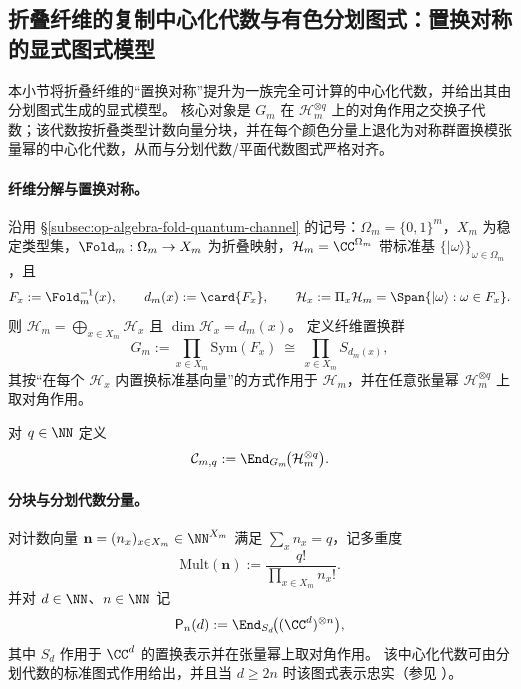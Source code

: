 \subsection{折叠纤维的复制中心化代数与有色分划图式：置换对称的显式图式模型}\label{subsec:op-algebra-fold-replication-centralizer}
本小节将折叠纤维的“置换对称”提升为一族完全可计算的中心化代数，并给出其由分划图式生成的显式模型。
核心对象是 \(G_m\) 在 \(\mathcal{H}_m^{\otimes q}\) 上的对角作用之交换子代数；该代数按折叠类型计数向量分块，并在每个颜色分量上退化为对称群置换模张量幂的中心化代数，从而与分划代数/平面代数图式严格对齐。

\providecommand{\ket}[1]{\lvert #1\rangle}
\providecommand{\bra}[1]{\langle #1\rvert}
\providecommand{\Mult}{\mathrm{Mult}}

\paragraph{纤维分解与置换对称。}
沿用 \S\ref{subsec:op-algebra-fold-quantum-channel} 的记号：\(\Omega_m=\{0,1\}^m\)，\(X_m\) 为稳定类型集，\(\Fold_m:\Omega_m\to X_m\) 为折叠映射，\(\mathcal{H}_m=\CC^{\Omega_m}\) 带标准基 \(\{\ket{\omega}\}_{\omega\in\Omega_m}\)，且
\[
F_x:=\Fold_m^{-1}(x),\qquad d_m(x):=\card{F_x},\qquad \mathcal{H}_x:=\Pi_x\mathcal{H}_m=\Span\{\ket{\omega}:\omega\in F_x\}.
\]
则 \(\mathcal{H}_m=\bigoplus_{x\in X_m}\mathcal{H}_x\) 且 \(\dim\mathcal{H}_x=d_m(x)\)。
定义纤维置换群
\[
G_m:=\prod_{x\in X_m}\mathrm{Sym}(F_x)\ \cong\ \prod_{x\in X_m}S_{d_m(x)},
\]
其按“在每个 \(\mathcal{H}_x\) 内置换标准基向量”的方式作用于 \(\mathcal{H}_m\)，并在任意张量幂 \(\mathcal{H}_m^{\otimes q}\) 上取对角作用。

\begin{definition}[复制中心化代数]\label{def:op-algebra-replication-centralizer}
对 \(q\in\NN\) 定义
\[
\mathcal{C}_{m,q}:=\End_{G_m}\!\bigl(\mathcal{H}_m^{\otimes q}\bigr).
\]
\end{definition}

\paragraph{分块与分划代数分量。}
对计数向量 \(\mathbf n=(n_x)_{x\in X_m}\in\NN^{X_m}\) 满足 \(\sum_{x}n_x=q\)，记多重度
\[
\mathrm{Mult}(\mathbf n):=\frac{q!}{\prod_{x\in X_m}n_x!}.
\]
并对 \(d\in\NN\)、\(n\in\NN\) 记
\[
\mathsf{P}_n(d):=\End_{S_d}\!\bigl((\CC^{d})^{\otimes n}\bigr),
\]
其中 \(S_d\) 作用于 \(\CC^d\) 的置换表示并在张量幂上取对角作用。
该中心化代数可由分划代数的标准图式作用给出，并且当 \(d\ge 2n\) 时该图式表示忠实（参见 \cite{BenkartHalverson2017PartitionInvariants,BowmanDotyMartin2022IntegralSchurWeylPartition}）。


